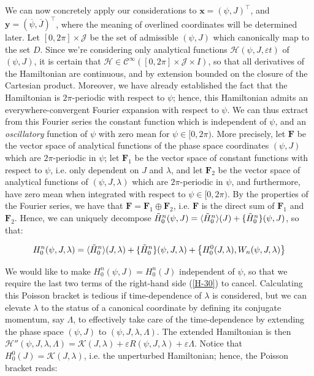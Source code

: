 \vspace*{2.5pt}

\quad We can now concretely apply our considerations to $\mathbf{x}=(\psi, J)^\top$, and $\mathbf{y}=(\overline{\psi},\overline{J})^\top$, where the meaning of overlined coordinates will be determined later. Let $[0,2\pi]\times \mathcal{J}$ be the set of admissible $(\psi, J)$ which canonically map to the set $D$. Since we're considering only analytical functions $\mathcal{H}(\psi, J, \varepsilon t)$ of $(\psi, J)$, it is certain that $\mathcal{H}\in\mathcal{C}^\infty([0,2\pi]\times\mathcal{J}\times I)$, so that all derivatives of the Hamiltonian are continuous, and by extension bounded on the closure of the Cartesian product. Moreover, we have already established the fact that the Hamiltonian is $2\pi$-periodic with respect to $\psi$; hence, this Hamiltonian admits an everywhere-convergent Fourier expansion with respect to $\psi$. We can thus extract from this Fourier series the constant function which is independent of $\psi$, and an \textit{oscillatory} function of $\psi$ with zero mean for $\psi\in[0,2\pi)$. More precisely, let $\mathbf{F}$ be the vector space of analytical functions of the phase space coordinates $(\psi, J)$ which are $2\pi$-periodic in $\psi$; let $\mathbf{F}_1$ be the vector space of constant functions with respect to $\psi$, i.e. only dependent on $J$ and $\lambda$, and let $\mathbf{F}_2$ be the vector space of analytical functions of $(\psi, J, \lambda)$ which are $2\pi$-periodic in $\psi$, and furthermore, have zero mean when integrated with respect to $\psi\in[0,2\pi)$. By the properties of the Fourier series, we have that $\mathbf{F}=\mathbf{F}_1\oplus \mathbf{F}_2$, i.e. $\mathbf{F}$ is the direct sum of $\mathbf{F}_1$ and $\mathbf{F}_2$. Hence, we can uniquely decompose $\Tilde{H}^n_0(\psi, J)=\langle\Tilde{H}^n_0\rangle(J)+\{\Tilde{H}^n_0\}(\psi, J)$, so that:

\begin{equation}
    \label{H-30}
    H^n_0(\psi,J,\lambda)=\langle\Tilde{H}^n_0\rangle(J,\lambda)+\{\Tilde{H}^n_0\}(\psi,J,\lambda)+\left\{H^0_0(J,\lambda),W_n(\psi,J,\lambda)\right\}
\end{equation}

We would like to make $H^n_0(\psi,J)=H^n_0(J)$ independent of $\psi$, so that we require the last two terms of the right-hand side (\ref{H-30}) to cancel. Calculating this Poisson bracket is tedious if time-dependence of $\lambda$ is considered, but we can elevate $\lambda$ to the status of a canonical coordinate by defining its conjugate momentum, say $\Lambda$, to effectively take care of the time-dependence by extending the phase space $(\psi, J)$ to $(\psi, J, \lambda, \Lambda)$. The extended Hamiltonian is then $\mathcal{H}''(\psi, J,\lambda, \Lambda)=\mathcal{K}(J,\lambda)+\varepsilon R(\psi, J, \lambda) + \varepsilon \Lambda$. Notice that $H^0_0(J)=\mathcal{K}(J,\lambda)$, i.e. the unperturbed Hamiltonian; hence, the Poisson bracket reads:

